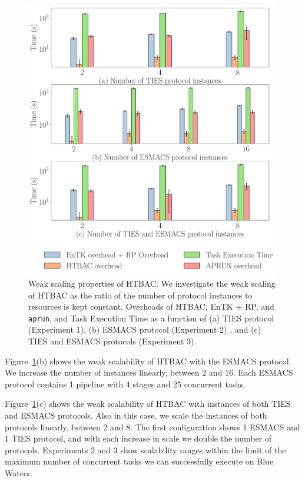 \begin{figure}
  \centering
    \includegraphics[width=\columnwidth]{figures/ws_all.pdf}
    \caption{Weak scaling properties of HTBAC. We investigate the weak
    scaling of HTBAC as the ratio of the number of protocol instances to
    resources is kept constant. Overheads of HTBAC, EnTK + RP, and
    \texttt{aprun}, and Task Execution Time as a function of (a) TIES
    protocol (Experiment 1), (b) ESMACS protocol (Experiment 2) , and (c)
    TIES and ESMACS protocols (Experiment 3).}
\label{fig:ws}
\end{figure}

Figure~\ref{fig:ws}(b) shows the weak scalability of HTBAC with the ESMACS
protocol. We increase the number of instances
linearly, between 2 and 16. Each ESMACS protocol contains 1 pipeline with 4
stages and 25 concurrent tasks.

Figure~\ref{fig:ws}(c) shows the weak scalability of HTBAC with instances of
both TIES and ESMACS protocols. Also in this case, we scale the instances of
both protocols linearly, between 2 and 8. The first configuration shows 1
ESMACS and 1 TIES protocol, and with each increase in scale we double the
number of protocols. Experiments 2 and 3 show scalability ranges within the
limit of the maximum number of concurrent tasks we can successfully execute
on Blue Waters. 

